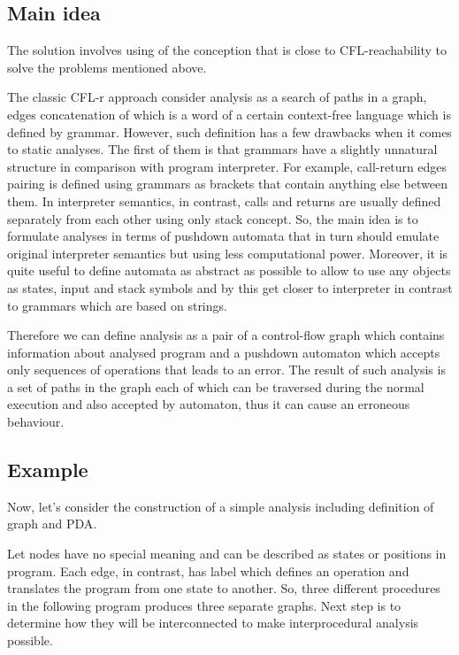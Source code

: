 \newcommand{\CS}{C\nolinebreak\hspace{-.05em}\raisebox{.4ex}{\scriptsize\bf \#}}

\subsection{Main idea}

The solution involves using of the conception that is close to CFL-reachability to solve the problems mentioned above.

The classic CFL-r approach consider analysis as a search of paths in a graph, edges concatenation of which is a word of a certain context-free language which is defined by grammar.
However, such definition has a few drawbacks when it comes to static analyses.
The first of them is that grammars have a slightly unnatural structure in comparison with program interpreter.
For example, call-return edges pairing is defined using grammars as brackets that contain anything else between them.
In interpreter semantics, in contrast, calls and returns are usually defined separately from each other using only stack concept.
So, the main idea is to formulate analyses in terms of pushdown automata that in turn should emulate original interpreter semantics but using less computational power.
Moreover, it is quite useful to define automata as abstract as possible to allow to use any objects as states, input and stack symbols and by this get closer to interpreter in contrast to grammars which are based on strings.

Therefore we can define analysis as a pair of a control-flow graph which contains information about analysed program and a pushdown automaton which accepts only sequences of operations that leads to an error.
The result of such analysis is a set of paths in the graph each of which can be traversed during the normal execution and also accepted by automaton, thus it can cause an erroneous behaviour.

\subsection{Example}

Now, let's consider the construction of a simple analysis including definition of graph and PDA. 

Let nodes have no special meaning and can be described as states or positions in program.
Each edge, in contrast, has label which defines an operation and translates the program from one state to another.
So, three different procedures in the following program produces three separate graphs.
Next step is to determine how they will be interconnected to make interprocedural analysis possible.

